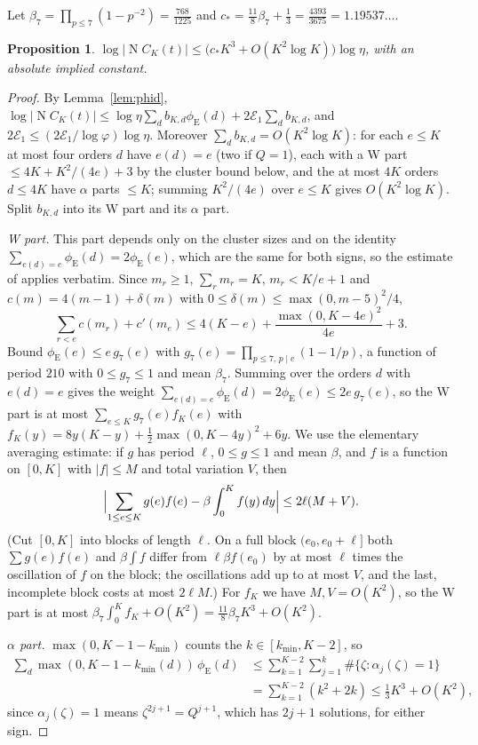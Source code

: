 \documentclass[11pt]{amsart}
\newtheorem{proposition}[theorem]{Proposition}
\theoremstyle{definition}
\theoremstyle{remark}
\numberwithin{equation}{section}
\newcommand{\Nm}{\operatorname{N}}
\newcommand{\eu}{\phi_{\mathrm E}}
\begin{document}
Let $\beta_7=\prod_{p\le7}(1-p^{-2})=\frac{768}{1225}$ and $c_*=\frac{11}8\beta_7+\frac13=\frac{4393}{3675}=1.19537\ldots$.

\begin{proposition}\label{prop:cost}
$\log|\Nm C_K(t)|\le\bigl(c_*K^3+O(K^2\log K)\bigr)\log\eta$, with an absolute implied constant.
\end{proposition}
\begin{proof}
By Lemma~\ref{lem:phid}, $\log|\Nm C_K(t)|\le\log\eta\sum_db_{K,d}\eu(d)+2\mathcal E_1\sum_db_{K,d}$, and
$2\mathcal E_1\le(2\mathcal E_1/\log\varphi)\log\eta$. Moreover $\sum_db_{K,d}=O(K^2\log K)$: for each $e\le K$ at most
four orders $d$ have $e(d)=e$ (two if $Q=1$), each with a W part $\le4K+K^2/(4e)+3$ by the cluster bound below, and the
at most $4K$ orders $d\le4K$ have $\alpha$ parts $\le K$; summing $K^2/(4e)$ over $e\le K$ gives $O(K^2\log K)$. Split
$b_{K,d}$ into its W part and its $\alpha$ part.

\emph{W part.} This part depends only on the cluster sizes and on the identity $\sum_{e(d)=e}\eu(d)=2\eu(e)$, which are
the same for both signs, so the estimate of \cite[Proposition~4.6]{Kri26} applies verbatim. Since $m_r\ge1$, $\sum_rm_r=K$,
$m_r<K/e+1$ and $c(m)=4(m-1)+\delta(m)$ with $0\le\delta(m)\le\max(0,m-5)^2/4$,
\[
\sum_{r<e}c(m_r)+c'(m_e)\le4(K-e)+\frac{\max(0,K-4e)^2}{4e}+3.
\]
Bound $\eu(e)\le e\,g_7(e)$ with $g_7(e)=\prod_{p\le7,\,p\mid e}(1-1/p)$, a function of period $210$ with
$0\le g_7\le1$ and mean $\beta_7$. Summing over the orders $d$ with $e(d)=e$ gives the weight
$\sum_{e(d)=e}\eu(d)=2\eu(e)\le2e\,g_7(e)$, so the W part is at most $\sum_{e\le K}g_7(e)f_K(e)$ with
$f_K(y)=8y(K-y)+\tfrac12\max(0,K-4y)^2+6y$. We use the elementary averaging estimate: if $g$ has period $\ell$,
$0\le g\le1$ and mean $\beta$, and $f$ is a function on $[0,K]$ with $|f|\le M$ and total variation $V$, then
\[
\Bigl|\sum_{1\le e\le K}g(e)f(e)-\beta\int_0^Kf(y)\,dy\Bigr|\le2\ell(M+V).
\]
(Cut $[0,K]$ into blocks of length $\ell$. On a full block $(e_0,e_0+\ell]$ both $\sum g(e)f(e)$ and $\beta\int f$
differ from $\ell\beta f(e_0)$ by at most $\ell$ times the oscillation of $f$ on the block; the oscillations add up to at
most $V$, and the last, incomplete block costs at most $2\ell M$.) For $f_K$ we have $M,V=O(K^2)$, so the W part is at
most $\beta_7\int_0^Kf_K+O(K^2)=\tfrac{11}8\beta_7K^3+O(K^2)$.

\emph{$\alpha$ part.} $\max(0,K-1-k_{\min})$ counts the $k\in[k_{\min},K-2]$, so
\[
\begin{aligned}
\sum_d\max(0,K-1-k_{\min}(d))\,\eu(d)&\le\sum_{k=1}^{K-2}\sum_{j=1}^k\#\{\zeta:\alpha_j(\zeta)=1\}\\
&=\sum_{k=1}^{K-2}(k^2+2k)\le\tfrac13K^3+O(K^2),
\end{aligned}
\]
since $\alpha_j(\zeta)=1$ means $\zeta^{2j+1}=Q^{j+1}$, which has $2j+1$ solutions, for either sign.
\end{proof}
\end{document}

